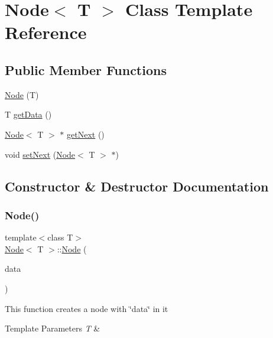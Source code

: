 \hypertarget{class_node}{}\section{Node$<$ T $>$ Class Template Reference}
\label{class_node}
\subsection*{Public Member Functions}
\begin{DoxyCompactItemize}
\item 
\mbox{\hyperlink{class_node_ab2f2bd0551fbce8ee80741462c9c86ef}{Node}} (T)
\item 
T \mbox{\hyperlink{class_node_a0c3315ee2e897e2a6e1c24aeca20aeb9}{get\+Data}} ()
\item 
\mbox{\hyperlink{class_node}{Node}}$<$ T $>$ $\ast$ \mbox{\hyperlink{class_node_a688501032615bbd05c9f42ef89d63db5}{get\+Next}} ()
\item 
void \mbox{\hyperlink{class_node_a44c4e1cb20b85f0cf5d463a802b3a0cd}{set\+Next}} (\mbox{\hyperlink{class_node}{Node}}$<$ T $>$ $\ast$)
\end{DoxyCompactItemize}


\subsection{Constructor \& Destructor Documentation}
\mbox{\label{class_node_ab2f2bd0551fbce8ee80741462c9c86ef}} 
\subsubsection{\texorpdfstring{Node()}{Node()}}
{\footnotesize\ttfamily template$<$class T$>$ \\
\mbox{\hyperlink{class_node}{Node}}$<$ T $>$\+::\mbox{\hyperlink{class_node}{Node}} (\begin{DoxyParamCaption}\item[{T}]{data }\end{DoxyParamCaption})}

This function creates a node with \char`\"{}data\char`\"{} in it 
\begin{DoxyTemplParams}{Template Parameters}
{\em T} & \\
\hline
\end{DoxyTemplParams}

